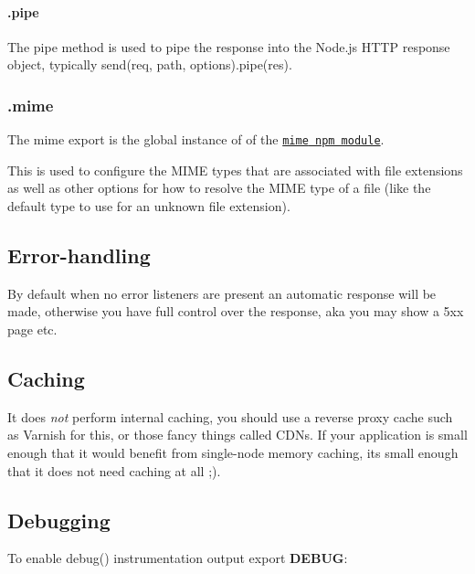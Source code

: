 \paragraph*{.pipe}

The {\ttfamily pipe} method is used to pipe the response into the Node.\+js H\+T\+TP response object, typically {\ttfamily send(req, path, options).pipe(res)}.

\subsubsection*{.mime}

The {\ttfamily mime} export is the global instance of of the \href{https://www.npmjs.com/package/mime}{\tt {\ttfamily mime} npm module}.

This is used to configure the M\+I\+ME types that are associated with file extensions as well as other options for how to resolve the M\+I\+ME type of a file (like the default type to use for an unknown file extension).

\subsection*{Error-\/handling}

By default when no {\ttfamily error} listeners are present an automatic response will be made, otherwise you have full control over the response, aka you may show a 5xx page etc.

\subsection*{Caching}

It does {\itshape not} perform internal caching, you should use a reverse proxy cache such as Varnish for this, or those fancy things called C\+D\+Ns. If your application is small enough that it would benefit from single-\/node memory caching, it\textquotesingle{}s small enough that it does not need caching at all ;).

\subsection*{Debugging}

To enable {\ttfamily debug()} instrumentation output export {\bfseries D\+E\+B\+UG}\+:




